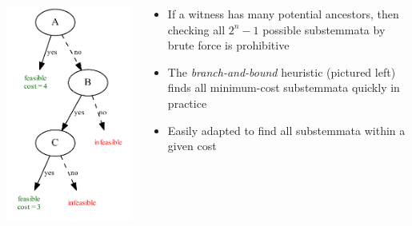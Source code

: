 \documentclass[10pt]{beamer}
\begin{document}
	\begin{frame}
		\begin{columns}
			\begin{column}{0.4\textwidth}
				\includegraphics[width=\textwidth]{../img/branch-and-bound-example.pdf}
			\end{column}
			\begin{column}{0.55\textwidth}
				\begin{itemize}
					\item If a witness has many potential ancestors, then checking all $2^n - 1$ possible substemmata by brute force is prohibitive
					\item The \emph{branch-and-bound} heuristic (pictured left) finds all minimum-cost substemmata quickly in practice
					\item Easily adapted to find all substemmata within a given cost
				\end{itemize}
			\end{column}
		\end{columns}
	\end{frame}
\end{document}

